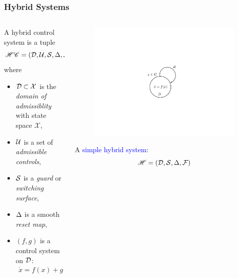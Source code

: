 \documentclass{beamer}
\begin{document}
\begin{frame}
  \frametitle{Hybrid Systems}
  \begin{columns}[t]
    \begin{column}{.63\textwidth}
      \begin{definition}
        A \alert{hybrid control system} is a tuple \vspace{-.3cm}
        $$\HCS = \hcsystem, \vspace{-.4cm}$$
        where
        \begin{itemize}
        \item
          $\mathcal{D} \subset \mathcal{X}$ is the {\em domain of admissiblity} with state space $\mathcal{X}$,
        \item
          $\mathcal{U}$ is a set of {\em admissible controls},
        \item
          $\mathcal{S}$ is a {\em guard} or {\em switching surface},
        \item
          $\Delta$ is a smooth {\em reset map},
        \item
          $(f, g)$ is a control system on $\mathcal{D}$: \vspace{-3mm}
          \begin{align*}
            \dot{x} = f(x) + g(x) \, u.
        \end{align*}
        \end{itemize}
      \end{definition}
    \end{column}
    \begin{column}{.4\textwidth}
      \begin{figure}
        \centering
        \includegraphics[width=.9\textwidth]{hsystem}\\
      \end{figure}
      A \textcolor{blue}{simple hybrid system}:\vspace{-.3cm}
      $$\mathscr{H} = (\mathcal{D}, \mathcal{S}, \Delta, \mathcal{F})$$
    \end{column}
  \end{columns}
\end{frame}
\end{document}
